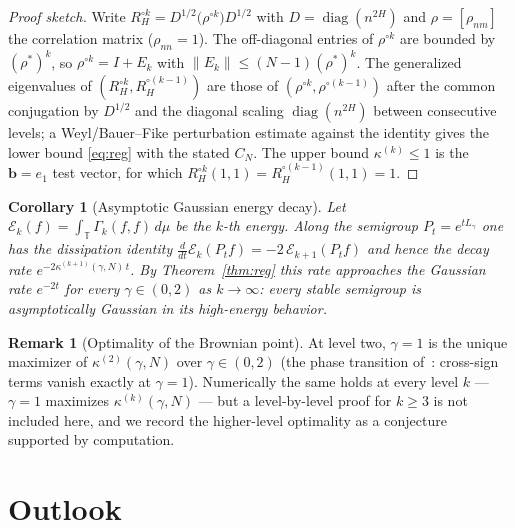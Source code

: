 \documentclass[11pt,reqno]{amsart}
\theoremstyle{plain}
\newtheorem{corollary}[theorem]{Corollary}
\theoremstyle{definition}
\newtheorem{remark}[theorem]{Remark}
\newcommand{\T}{\mathbb{T}}
\newcommand{\Had}{\mathbin{\circ}}     %
\DeclareMathOperator{\diag}{diag}
\newcommand{\Gam}{\Gamma}
\begin{document}
\begin{proof}[Proof sketch]
Write $R_H^{\Had k}=D^{1/2}\bigl(\rho^{\Had k}\bigr)D^{1/2}$ with
$D=\diag(n^{2H})$ and $\rho=[\rho_{nm}]$ the correlation matrix ($\rho_{nn}=1$).
The off-diagonal entries of $\rho^{\Had k}$ are bounded by $(\rho^{*})^{k}$, so
$\rho^{\Had k}=I+E_k$ with $\|E_k\|\le(N-1)(\rho^{*})^{k}$. The generalized
eigenvalues of $(R_H^{\Had k},R_H^{\Had(k-1)})$ are those of
$(\rho^{\Had k},\rho^{\Had(k-1)})$ after the common conjugation by $D^{1/2}$ and
the diagonal scaling $\diag(n^{2H})$ between consecutive levels; a Weyl/Bauer--Fike
perturbation estimate against the identity gives the lower bound
\eqref{eq:reg} with the stated $C_N$. The upper bound $\kappa^{(k)}\le1$ is the
$\mathbf b=e_1$ test vector, for which $R_H^{\Had k}(1,1)=R_H^{\Had(k-1)}(1,1)=1$.
\end{proof}

\begin{corollary}[Asymptotic Gaussian energy decay]\label{cor:gauss}
Let $\mathcal E_k(f)=\int_\T\Gam_k(f,f)\,d\mu$ be the $k$-th energy. Along the
semigroup $P_t=e^{tL_\gamma}$ one has the dissipation identity
$\frac{d}{dt}\mathcal E_k(P_tf)=-2\,\mathcal E_{k+1}(P_tf)$ and hence the decay
rate $e^{-2\kappa^{(k+1)}(\gamma,N)\,t}$. By Theorem~\ref{thm:reg} this rate
approaches the Gaussian rate $e^{-2t}$ for every $\gamma\in(0,2)$ as $k\to\infty$:
every stable semigroup is asymptotically Gaussian in its high-energy behavior.
\end{corollary}

\begin{remark}[Optimality of the Brownian point]\label{rem:opt}
At level two, $\gamma=1$ is the unique maximizer of $\kappa^{(2)}(\gamma,N)$ over
$\gamma\in(0,2)$ (the phase transition of~\cite{FontesPartI}: cross-sign terms
vanish exactly at $\gamma=1$). Numerically the same holds at every level $k$ ---
$\gamma=1$ maximizes $\kappa^{(k)}(\gamma,N)$ --- but a level-by-level proof for
$k\ge3$ is not included here, and we record the higher-level optimality as a
conjecture supported by computation.
\end{remark}

\section{Outlook}\label{sec:outlook}
\end{document}
